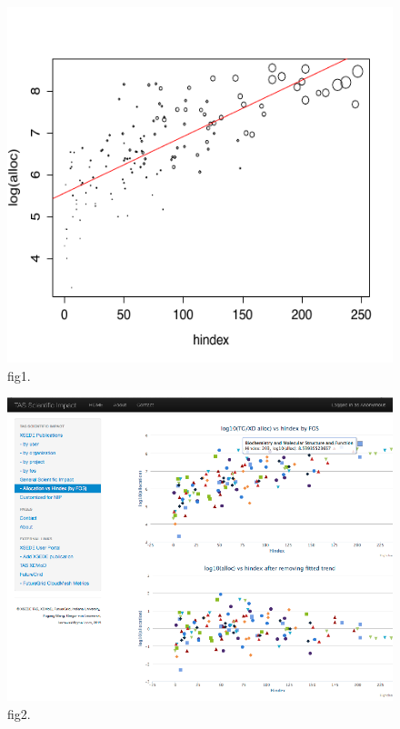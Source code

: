 \begin{figure}[htb]
  \centering
    \includegraphics[width=1.0\columnwidth]{images/fig1.pdf}
  \caption{fig1.}\label{F:fig1}
\end{figure}

\begin{figure}[htb]
  \centering
    \includegraphics[width=1.0\columnwidth]{images/fig2.pdf}
  \caption{fig2.}\label{F:fig2}
\end{figure}

